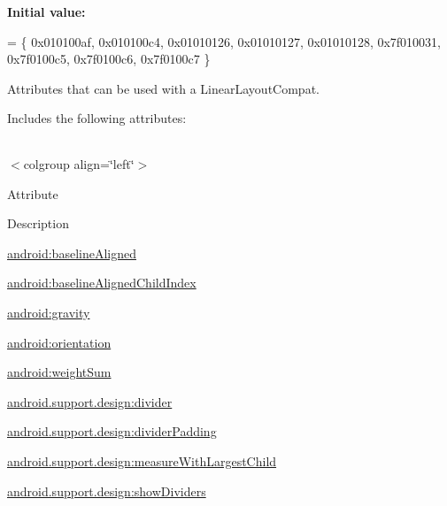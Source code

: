 {\bfseries Initial value\+:}
\begin{DoxyCode}
= \{
            0x010100af, 0x010100c4, 0x01010126, 0x01010127,
            0x01010128, 0x7f010031, 0x7f0100c5, 0x7f0100c6,
            0x7f0100c7
        \}
\end{DoxyCode}
Attributes that can be used with a Linear\+Layout\+Compat. 

Includes the following attributes\+:

\tabulinesep=1mm
\begin{longtabu} spread 0pt [c]{*{0}{|X[-1]}|}
\hline
\end{longtabu}
$<$colgroup align=\char`\"{}left\char`\"{}$>$ 

Attribute

Description 

{\ttfamily \hyperlink{classandroid_1_1support_1_1design_1_1R_1_1styleable_a9d55bf7dbe65d98e7ba6f34b30430e6c}{android\+:baseline\+Aligned}}

{\ttfamily \hyperlink{classandroid_1_1support_1_1design_1_1R_1_1styleable_a37112cf8a879aba4faa808e638c0f956}{android\+:baseline\+Aligned\+Child\+Index}}

{\ttfamily \hyperlink{classandroid_1_1support_1_1design_1_1R_1_1styleable_a0c12043536404528247f7baea154f226}{android\+:gravity}}

{\ttfamily \hyperlink{classandroid_1_1support_1_1design_1_1R_1_1styleable_af6d43237e69e14453825f99f1ca834ee}{android\+:orientation}}

{\ttfamily \hyperlink{classandroid_1_1support_1_1design_1_1R_1_1styleable_a849b25d442594683c74cbb079d01e97c}{android\+:weight\+Sum}}

{\ttfamily \hyperlink{classandroid_1_1support_1_1design_1_1R_1_1styleable_af717aeae3bc1ab1dd5fa67dd5dbcf7f4}{android.\+support.\+design\+:divider}}

{\ttfamily \hyperlink{classandroid_1_1support_1_1design_1_1R_1_1styleable_ab9d976c9fc0ba16e05e50c57f510e043}{android.\+support.\+design\+:divider\+Padding}}

{\ttfamily \hyperlink{classandroid_1_1support_1_1design_1_1R_1_1styleable_a5ea39aa0bc15c41a608e69496fecb711}{android.\+support.\+design\+:measure\+With\+Largest\+Child}}

{\ttfamily \hyperlink{classandroid_1_1support_1_1design_1_1R_1_1styleable_af92c8ae01241fac2f25cd795b2d750aa}{android.\+support.\+design\+:show\+Dividers}}

